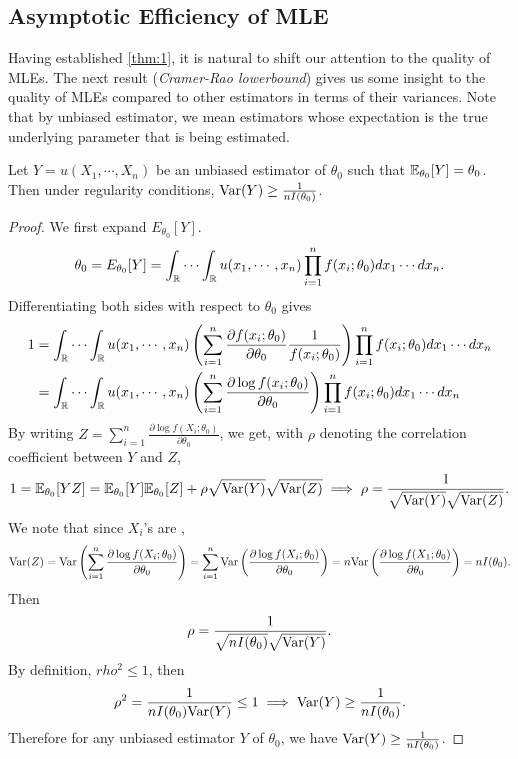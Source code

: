 \subsection{Asymptotic Efficiency of MLE}
Having established \cref{thm:1}, it is natural to shift our attention to the quality of MLEs. The next result (\emph{Cramer-Rao lowerbound}) gives us some insight to the quality of MLEs compared to other estimators in terms of their variances. Note that by unbiased estimator, we mean estimators whose expectation is the true underlying parameter that is being estimated.
\begin{theorem}\label{thm:2}
Let $Y = u(X_1,\cdots,X_n)$ be an unbiased estimator of $\theta_0$ such that $\mathbb{E}_{\theta_0}[Y] = \theta_0$. Then under regularity conditions, $\text{Var}(Y) \geq \frac{1}{nI(\theta_0)}$.
\end{theorem}
\begin{proof}
We first expand $E_{\theta_0}[Y]$.
\begin{align*}
\theta_0 = E_{\theta_0}[Y] = \int_{\mathbb{R}}\cdots\int_{\mathbb{R}} u(x_1,\cdots,x_n)\prod_{i=1}^nf(x_i;\theta_0)dx_1\cdots dx_n.
\end{align*}
Differentiating both sides with respect to $\theta_0$ gives
\begin{align*}
1 &= \int_{\mathbb{R}}\cdots\int_{\mathbb{R}} u(x_1,\cdots,x_n) \left(\sum_{i=1}^n \frac{\partial f(x_i;\theta_0)}{\partial\theta_0} \frac{1}{f(x_i;\theta_0)}\right) \prod_{i=1}^nf(x_i;\theta_0)dx_1\cdots dx_n\\
&= \int_{\mathbb{R}}\cdots\int_{\mathbb{R}} u(x_1,\cdots,x_n) \left(\sum_{i=1}^n \frac{\partial \log f(x_i;\theta_0)}{\partial\theta_0} \right) \prod_{i=1}^nf(x_i;\theta_0)dx_1\cdots dx_n
\end{align*}
By writing $Z = \sum_{i=1}^n \frac{\partial \log f(X_i;\theta_0)}{\partial\theta_0}$, we get, with $\rho$ denoting the correlation coefficient between $Y$ and $Z$,
\begin{align*}
1 = \mathbb{E}_{\theta_0}[YZ] = \mathbb{E}_{\theta_0}[Y]\mathbb{E}_{\theta_0}[Z] + \rho\sqrt{\text{Var}(Y)}\sqrt{\text{Var}(Z)} \implies \rho = \frac{1}{\sqrt{\text{Var}(Y)}\sqrt{\text{Var}(Z)}}.
\end{align*}
We note that since $X_i$'s are \iid,
\begin{align*}
\text{Var}(Z) = \text{Var}\left( \sum_{i=1}^n \frac{\partial \log f(X_i;\theta_0)}{\partial\theta_0} \right)
= \sum_{i=1}^n \text{Var}\left(\frac{\partial \log f(X_i;\theta_0)}{\partial\theta_0}\right)
= n\text{Var}\left(\frac{\partial \log f(X_1;\theta_0)}{\partial\theta_0}\right)
= nI(\theta_0).
\end{align*}
Then
\begin{align*}
\rho = \frac{1}{\sqrt{nI(\theta_0)}\sqrt{\text{Var}(Y)}}.
\end{align*}
By definition, $rho^2 \leq 1$, then
\begin{align*}
\rho^2 = \frac{1}{nI(\theta_0)\text{Var}(Y)} \leq 1 \implies \text{Var}(Y) \geq \frac{1}{nI(\theta_0)}.
\end{align*}
Therefore for any unbiased estimator $Y$ of $\theta_0$, we have $\text{Var}(Y) \geq \frac{1}{nI(\theta_0)}$.
\end{proof}
